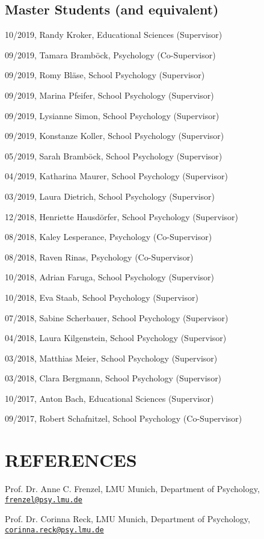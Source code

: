 \documentclass[letterpaper]{article}
\renewenvironment{itemize}{ %
  \begin{list}{}{ %
    \setlength{\leftmargin}{2.5em} %
  }
}{
  \end{list}
}
\begin{document}
\subsection*{Master Students (and equivalent)}
\begin{itemize}
\item 10/2019, Randy Kroker, Educational Sciences (Supervisor)
\item 09/2019, Tamara Bramböck, Psychology (Co-Supervisor)
\item 09/2019, Romy Bläse, School Psychology (Supervisor)
\item 09/2019, Marina Pfeifer, School Psychology (Supervisor)
\item 09/2019, Lysianne Simon, School Psychology (Supervisor)
\item 09/2019, Konstanze Koller, School Psychology (Supervisor)
\item 05/2019, Sarah Bramböck, School Psychology (Supervisor)
\item 04/2019, Katharina Maurer, School Psychology (Supervisor)
\item 03/2019, Laura Dietrich, School Psychology (Supervisor)
\item 12/2018, Henriette Hausdörfer, School Psychology (Supervisor)
\item 08/2018, Kaley Lesperance, Psychology (Co-Supervisor)
\item 08/2018, Raven Rinas, Psychology (Co-Supervisor)
\item 10/2018, Adrian Faruga, School Psychology (Supervisor)
\item 10/2018, Eva Staab, School Psychology (Supervisor)
\item 07/2018, Sabine Scherbauer, School Psychology (Supervisor)
\item 04/2018, Laura Kilgenstein, School Psychology (Supervisor)
\item 03/2018, Matthias Meier, School Psychology (Supervisor)
\item 03/2018, Clara Bergmann, School Psychology (Supervisor)
\item 10/2017, Anton Bach, Educational Sciences (Supervisor)
\item 09/2017, Robert Schafnitzel, School Psychology (Co-Supervisor)
\end{itemize}


\section*{REFERENCES}
\begin{itemize}
\item[$\ast$] Prof. Dr. Anne C. Frenzel, LMU Munich, Department of Psychology, \href{mailto:frenzel@psy.lmu.de}{\tt frenzel@psy.lmu.de} 
\item[$\ast$] Prof. Dr. Corinna Reck, LMU Munich, Department of Psychology, \href{mailto:corinna.reck@psy.lmu.de}{\tt corinna.reck@psy.lmu.de} 
\end{itemize}
\end{document}
